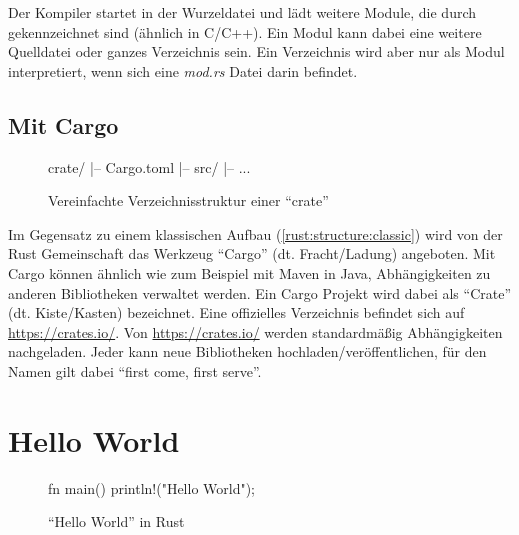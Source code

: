 Der Kompiler startet in der Wurzeldatei und lädt weitere Module, die durch  gekennzeichnet sind (ähnlich  in C/C++).
Ein Modul kann dabei eine weitere Quelldatei oder ganzes Verzeichnis sein.
Ein Verzeichnis wird aber nur als Modul interpretiert, wenn sich eine \textit{mod.rs} Datei darin befindet.

\subsection{Mit Cargo}
\label{rust:structure:cargo}

\begin{wrapfigure}{r}[-1em]{.4\textwidth}
	\hspace{1em}
	\begin{rustc}
		crate/
		|-- Cargo.toml
		|-- src/
		    |-- ...
	\end{rustc}
	\caption{Vereinfachte Verzeichnisstruktur einer \enquote{crate}}
	\label{fig:rust:structure:cargo}
\end{wrapfigure}

Im Gegensatz zu einem klassischen Aufbau (\autoref{rust:structure:classic}) wird von der Rust Gemeinschaft das Werkzeug \enquote{Cargo} (dt. Fracht/Ladung) angeboten.
Mit Cargo können ähnlich wie zum Beispiel mit Maven  in Java, Abhängigkeiten zu anderen Bibliotheken verwaltet werden.
Ein Cargo Projekt wird dabei als \enquote{Crate} (dt. Kiste/Kasten) bezeichnet.
Eine offizielles Verzeichnis befindet sich auf \url{https://crates.io/}.
Von \url{https://crates.io/} werden standardmäßig Abhängigkeiten nachgeladen.
Jeder kann neue Bibliotheken hochladen/veröffentlichen, für den Namen gilt dabei \enquote{first come, first serve}.

\todo{[crates.io]}

\section{Hello World}


\begin{wrapfigure}{l}{.5\textwidth}
	\begin{rustc}
		fn main() {
			println!("Hello World");
		}
	\end{rustc}
	\caption{\enquote{Hello World} in Rust}
	\label{fig:rust:hello_world}
\end{wrapfigure}

